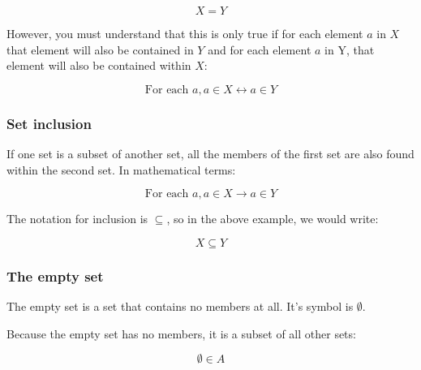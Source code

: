 \begin{dmath*}
	X = Y
\end{dmath*}

However, you must understand that this is only true if for each element $a$ in
$X$ that element will also be contained in $Y$ and for each element $a$ in Y,
that element will also be contained within $X$:

\begin{dmath*}
	{\textrm{For each }a, a \in X \leftrightarrow a \in Y}
\end{dmath*}


\subsubsection{Set inclusion}

If one set is a subset of another set, all the members of the first set are also
found within the second set. In mathematical terms:

\begin{dmath*}
	{\textrm{For each }a, a \in X \rightarrow a \in Y}
\end{dmath*}

The notation for inclusion is $\subseteq$, so in the above example, we would
write:

\begin{dmath*}
	X \subseteq Y
\end{dmath*}


\subsubsection{The empty set}
\label{subsubsec:empty_set}

The empty set is a set that contains no members at all. It's symbol is
$\emptyset$.

Because the empty set has no members, it is a subset of all other sets:

\begin{dmath*}
	\emptyset \in A
\end{dmath*}

